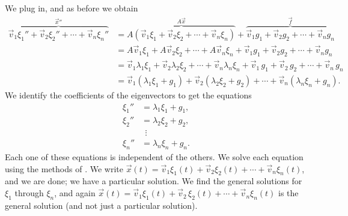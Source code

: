 We plug in, and as before we obtain
\begin{equation*}
\begin{split}
\overbrace{
\vec{v}_1 \xi_1'' + 
\vec{v}_2 \xi_2'' + \cdots +
\vec{v}_n \xi_n''
}^{{\vec{x}}''}
& =
\overbrace{
A \left( \vec{v}_1 \xi_1 + 
\vec{v}_2 \xi_2 + \cdots +
\vec{v}_n \xi_n \right)
}^{A\vec{x}}
+
\overbrace{
\vec{v}_1 g_1 + 
\vec{v}_2 g_2 + \cdots +
\vec{v}_n g_n
}^{\vec{f}}
\\
& = 
A \vec{v}_1 \xi_1 + 
A \vec{v}_2 \xi_2 + \cdots +
A \vec{v}_n \xi_n
+
\vec{v}_1 g_1 + 
\vec{v}_2 g_2 + \cdots +
\vec{v}_n g_n
\\
& =
\vec{v}_1 \lambda_1 \xi_1 + 
\vec{v}_2 \lambda_2 \xi_2 + \cdots +
\vec{v}_n \lambda_n \xi_n
+
\vec{v}_1 \, g_1 + 
\vec{v}_2 \, g_2 + \cdots +
\vec{v}_n \, g_n
\\
& =
\vec{v}_1 ( \lambda_1 \xi_1 + g_1 ) +
\vec{v}_2 ( \lambda_2 \xi_2 + g_2 ) + \cdots + 
\vec{v}_n ( \lambda_n \xi_n + g_n ) .
\end{split}
\end{equation*}
We identify the coefficients of the eigenvectors to get the equations
\begin{align*}
\xi_1'' & = \lambda_1 \xi_1 + g_1 , \\
\xi_2'' & = \lambda_2 \xi_2 + g_2 , \\
& ~~ \vdots \\
\xi_n'' & = \lambda_n \xi_n + g_n .
\end{align*}
Each one of these equations is independent of the others.
We solve each equation using the methods of .
We write
$\vec{x}(t) =
\vec{v}_1 \xi_1(t) +
\vec{v}_2 \xi_2(t) + \cdots +
\vec{v}_n \xi_n(t)$, and we are done; we have a particular solution.
We find the general solutions for $\xi_1$ through $\xi_n$, and
again
$\vec{x}(t) =
\vec{v}_1 \xi_1(t) + \vec{v}_2 \, \xi_2(t) + \cdots +
\vec{v}_n \xi_n(t)$ is the general solution (and not just a particular
solution).

